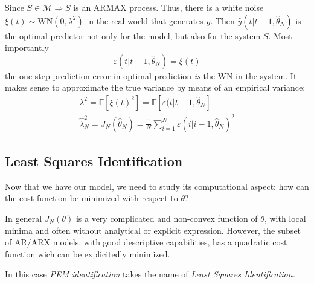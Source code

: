 Since $ S\in \mathcal{M} \Longrightarrow S$ is an ARMAX process. Thus, there is a white noise $ \xi ( t) \sim \text{WN}\left( 0,\lambda ^{2}\right)$ in the real world that generates $ y$. Then $ \hat{y}( t|t-1,\hat{\theta }_{N})$ is the optimal predictor not only for the model, but also for the system $ S$. Most importantly
\begin{equation*}
\varepsilon ( t|t-1,\hat{\theta }_{N}) =\xi ( t)
\end{equation*}
the one-step prediction error in optimal prediction \textit{is} the WN in the system. It makes sense to approximate the true variance by means of an empirical variance:
\begin{gather*}
\lambda ^{2} =\mathbb{E}\left[ \xi ( t)^{2}\right] =\mathbb{E}[ \varepsilon ( t|t-1,\hat{\theta }_{N}]\\
\hat{\lambda }_{N}^{2} =J_{N}(\hat{\theta }_{N}) =\frac{1}{N}\sum _{i=1}^{N} \varepsilon ( i|i-1,\hat{\theta }_{N})^{2}
\end{gather*}

\subsection{Least Squares Identification}
Now that we have our model, we need to study its computational aspect: how can the cost function be minimized with respect to $ \theta ?$

In general $ J_{N}( \theta )$ is a very complicated and non-convex function of $ \theta $, with local minima and often without analytical or explicit expression. However, the subset of AR/ARX models, with good descriptive capabilities, has a quadratic cost function wich can be explicitedly minimized.

In this case \textit{PEM identification} takes the name of \textit{Least Squares Identification. }

